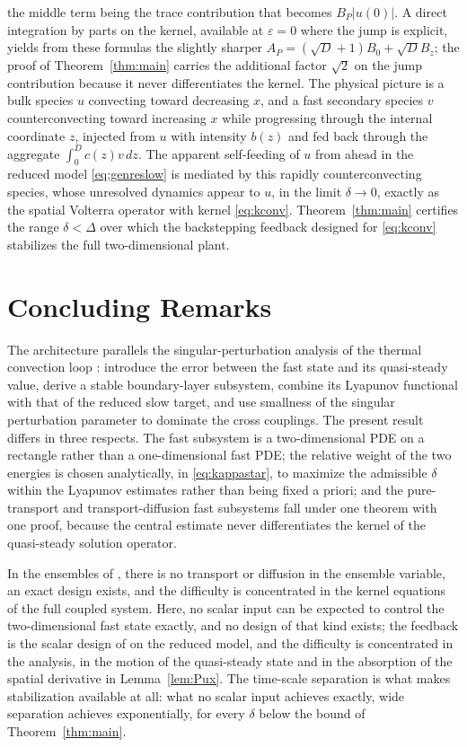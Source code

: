 \documentclass[12pt]{article}
\theoremstyle{plain}
\theoremstyle{remark}
\begin{document}
the middle term being the trace contribution that becomes $B_P|u(0)|$. A direct integration by parts on the kernel, available at $\varepsilon=0$ where the jump is explicit, yields from these formulas the slightly sharper $A_P=(\sqrt D+1)B_0+\sqrt DB_z$; the proof of Theorem~\ref{thm:main} carries the additional factor $\sqrt2$ on the jump contribution because it never differentiates the kernel. The physical picture is a bulk species $u$ convecting toward decreasing $x$, and a fast secondary species $v$ counterconvecting toward increasing $x$ while progressing through the internal coordinate $z$, injected from $u$ with intensity $b(z)$ and fed back through the aggregate $\int_0^Dc(z)v\,dz$. The apparent self-feeding of $u$ from ahead in the reduced model \eqref{eq:genreslow} is mediated by this rapidly counterconvecting species, whose unresolved dynamics appear to $u$, in the limit $\delta\to0$, exactly as the spatial Volterra operator with kernel \eqref{eq:kconv}. Theorem~\ref{thm:main} certifies the range $\delta<\Delta$ over which the backstepping feedback designed for \eqref{eq:kconv} stabilizes the full two-dimensional plant.

\section{Concluding Remarks}
The architecture parallels the singular-perturbation analysis of the thermal convection loop \cite{VazquezKrstic2006}: introduce the error between the fast state and its quasi-steady value, derive a stable boundary-layer subsystem, combine its Lyapunov functional with that of the reduced slow target, and use smallness of the singular perturbation parameter to dominate the cross couplings. The present result differs in three respects. The fast subsystem is a two-dimensional PDE on a rectangle rather than a one-dimensional fast PDE; the relative weight of the two energies is chosen analytically, in \eqref{eq:kappastar}, to maximize the admissible $\delta$ within the Lyapunov estimates rather than being fixed a priori; and the pure-transport and transport-diffusion fast subsystems fall under one theorem with one proof, because the central estimate never differentiates the kernel of the quasi-steady solution operator.

In the ensembles of \cite{AlleaumeKrstic2025}, there is no transport or diffusion in the ensemble variable, an exact design exists, and the difficulty is concentrated in the kernel equations of the full coupled system. Here, no scalar input can be expected to control the two-dimensional fast state exactly, and no design of that kind exists; the feedback is the scalar design of \cite{KrsticSmyshlyaev2008} on the reduced model, and the difficulty is concentrated in the analysis, in the motion of the quasi-steady state and in the absorption of the spatial derivative in Lemma~\ref{lem:Pux}. The time-scale separation is what makes stabilization available at all: what no scalar input achieves exactly, wide separation achieves exponentially, for every $\delta$ below the bound of Theorem~\ref{thm:main}.
\end{document}
